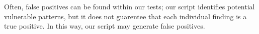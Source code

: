 Often, false positives can be found within our tests; our script 
identifies potential vulnerable patterns, but it does not guarentee
that each individual finding is a true positive. In this way, our script
may generate false positives.



